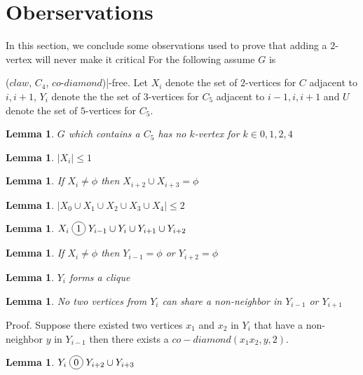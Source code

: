 \documentclass[12pt]{article}
\newcommand*\circled[1]{\tikz[baseline=(char.base)]{
            \node[shape=circle,draw,inner sep=2pt] (char) {#1};}}
\newtheorem{Lemma}[Theorem]{Lemma}
\def\CCD{($claw$, $C_4$, $co$-$diamond$)}
\begin{document}
\section{Oberservations}\label{sec:observations}
In this section, we conclude some observations used to prove that adding a $2$-vertex will never make it critical For the following assume $G$ is {\CCD|-free. Let $X_i$ denote the set of $2$-vertices for $C$ adjacent to $i, i+1$, $Y_i$ denote the the set of $3$-vertices for $C_5$ adjacent to $i-1, i, i+1$ and $U$ denote the set of $5$-vertices for $C_5$.

\begin{Lemma}\label{lem:c5-k-vertex}
$G$ which contains a $C_5$ has no $k$-vertex for $k \in {0, 1, 2, 4}$
\end{Lemma}

\begin{Lemma}\label{lem:max-2-xi}
$|X_i| \leq 1$
\end{Lemma}

\begin{Lemma}\label{lem:xi-no-xi2}
If $X_i \neq \phi$ then $X_{i+2} \cup X_{i+3} = \phi$
\end{Lemma}

\begin{Lemma}\label{lem:max-2-2K}
$|X_0 \cup X_1 \cup X_2 \cup X_3 \cup X_4| \leq 2$
\end{Lemma}

\begin{Lemma}\label{lem:2k-join-3k}
$X_i \;\circled{1}\; Y_{i-1} \cup Y_{i} \cup Y_{i+1} \cup Y_{i+2}$ 
\end{Lemma}

\begin{Lemma}\label{lem:Xi-Yi-noYi}
If $X_i \neq \phi$ then $Y_{i-1} =\phi$ or $Y_{i+2} = \phi$
\end{Lemma}

\begin{Lemma}\label{lem:3K-clique}
$Y_i$ forms a clique
\end{Lemma}

\begin{Lemma}\label{lem:si-no-share-vertex}
No two vertices from $Y_i$ can share a non-neighbor in $Y_{i-1}$ or $Y_{i+1}$
\end{Lemma}
\noindent {\it} Proof. Suppose there existed two vertices $x_1$ and $x_2$ in $Y_i$ that have a non-neighbor $y$ in $Y_{i-1}$ then there exists a $co-diamond (x_1x_2, y, 2)$.

\begin{Lemma}\label{lem:yi-adjacency-yi2}
$Y_i \;\circled{0}\; Y_{i+2} \cup Y_{i+3} $
\end{Lemma}

}
\end{document}
